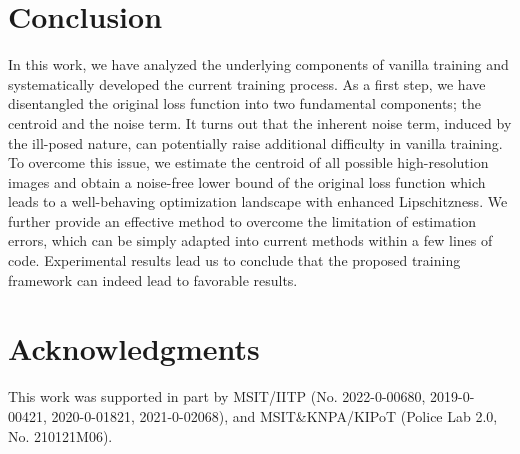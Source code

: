 \documentclass[letterpaper]{article} %
\begin{document}
\section{Conclusion}
In this work, we have analyzed the underlying components of vanilla training and systematically developed the current training process.
%
As a first step, we have disentangled the original loss function into two fundamental components; the centroid and the noise term.
%
It turns out that the inherent noise term, induced by the ill-posed nature, can potentially raise additional difficulty in vanilla training.
%
To overcome this issue, we estimate the centroid of all possible high-resolution images and obtain a noise-free lower bound of the original loss function which leads to a well-behaving optimization landscape with enhanced Lipschitzness. 
%
We further provide an effective method to overcome the limitation of estimation errors, which can be simply adapted into current methods within a few lines of code. 
%
Experimental results lead us to conclude that the proposed training framework can indeed lead to favorable results.
%


\section*{Acknowledgments}
This work was supported in part by MSIT/IITP (No. 2022-0-00680, 2019-0-00421, 2020-0-01821, 2021-0-02068), and MSIT\&KNPA/KIPoT (Police Lab 2.0, No. 210121M06).









\end{document}
